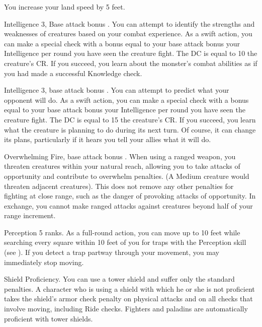  You increase your land speed by 5 feet.

 Intelligence 3, Base attack bonus .
 You can attempt to identify the strengths and weaknesses of creatures based on your combat experience. As a swift action, you can make a special check with a bonus equal to your base attack bonus \add your Intelligence  per round you have seen the creature fight. The DC is equal to 10 \add the creature's CR. If you succeed, you learn about the monster's combat abilities as if you had made a successful Knowledge check.

 Intelligence 3, base attack bonus .
 You can attempt to predict what your opponent will do. As a swift action, you can make a special check with a bonus equal to your base attack bonus \add your Intelligence  per round you have seen the creature fight. The DC is equal to 15 \add the creature's CR. If you succeed, you learn what the creature is planning to do during its next turn. Of course, it can change its plans, particularly if it hears you tell your allies what it will do.

\featpre Overwhelming Fire, base attack bonus .
\featben When using a ranged weapon, you threaten creatures within your natural reach, allowing you to take attacks of opportunity and contribute to overwhelm penalties. (A Medium creature would threaten adjacent creatures). This does not remove any other penalties for fighting at close range, such as the danger of provoking attacks of opportunity. In exchange, you cannot make ranged attacks against creatures beyond half of your range increment.

\featpre Perception 5 ranks.
\featben As a full-round action, you can move up to 10 feet while searching every square within 10 feet of you for traps with the Perception skill (see ). If you detect a trap partway through your movement, you may immediately stop moving.

 Shield Proficiency.
 You can use a tower shield and suffer only the standard penalties.
 A character who is using a shield with which he or she is not proficient takes the shield's armor check penalty on physical attacks and on all checks that involve moving, including Ride checks.
 Fighters and paladins are automatically proficient with tower shields.

